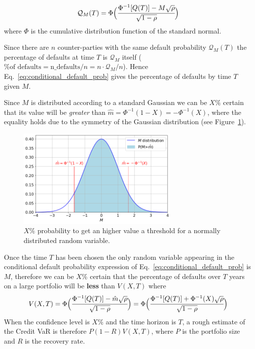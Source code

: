 \begin{equation}
\mathcal{Q}_M(T) = \Phi\Big(\cfrac{\Phi^{-1}[Q(T)]-M\sqrt{\rho}}{\sqrt{1-\rho}}\Big)
\label{eq:conditional_default_prob}
\end{equation}
where $\Phi$ is the cumulative distribution function of the standard normal.

Since there are $n$ counter-parties with the same default probability $\mathcal{Q}_M(T)$ the percentage of defaults at time $T$ is $\mathcal{Q}_M$ itself ($\textrm{\% of defaults} = \textrm{n\_defaults}/n = n\cdot \mathcal{Q}_M/n$). Hence Eq.~\ref{eq:conditional_default_prob} gives the percentage of defaults by time $T$ given $M$. 

Since $M$ is distributed according to a standard Gaussian we can be $X\%$ certain that its value will be \emph{greater} than $\hat{m} = \Phi^{-1}(1-X)=-\Phi^{-1}(X)$, where the equality holds due to the symmetry of the Gaussian distribution (see Figure~\ref{fig:certain_for_X}).

\begin{figure}[htb]
	\centering
	\includegraphics[width=0.7\textwidth]{figures/certain_for_X}
	\caption{$X\%$ probability to get an higher value a threshold for a normally distributed random variable.}
	\label{fig:certain_for_X}
\end{figure} 

Once the time $T$ has been chosen the only random variable appearing in the conditional default probability expression of Eq.~\ref{eq:conditional_default_prob} is $M$, therefore we can be $X\%$ certain that the percentage of defaults over $T$ years on a large portfolio will be \textbf{less} than $V(X,T)$ where
\[
V(X,T)= \Phi\Big(\cfrac{\Phi^{-1}[Q(T)]-\hat{m}\sqrt{\rho}}{\sqrt{1-\rho}}\Big) = \Phi\Big(\cfrac{\Phi^{-1}[Q(T)]+\Phi^{-1}(X)\sqrt{\rho}}{\sqrt{1-\rho}}\Big)
\]
When the confidence level is $X\%$ and the time horizon is $T$, a rough estimate of the Credit VaR is therefore $P(1-R)V(X,T)$, where $P$ is the portfolio size and $R$ is the recovery rate.


